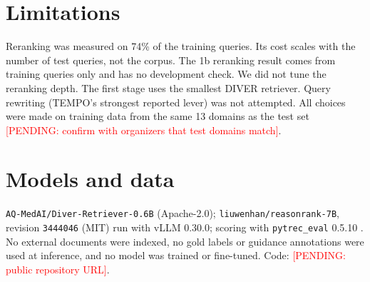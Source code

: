 \documentclass[11pt]{article}
\newcommand{\pending}[1]{\textcolor{red}{[PENDING: #1]}}
\begin{document}
\section{Limitations}
Reranking was measured on 74\% of the training queries. Its cost scales with the number of test
queries, not the corpus. The 1b reranking result comes from training queries only and has no development check. We did not tune the reranking depth. The first stage uses the smallest
DIVER retriever. Query rewriting (TEMPO's strongest reported lever) was not attempted. All
choices were made on training data from the same 13 domains as the test set
\pending{confirm with organizers that test domains match}.

\section*{Models and data}
\texttt{AQ-MedAI/Diver-Retriever-0.6B} (Apache-2.0); \texttt{liuwenhan/reasonrank-7B}, revision
\texttt{3444046} (MIT) run with vLLM 0.30.0; scoring with \texttt{pytrec\_eval} 0.5.10 \citep{vangysel2018pytreceval}.
No external documents were indexed, no gold labels or guidance annotations were used at
inference, and no model was trained or fine-tuned. Code: \pending{public repository URL}.


\end{document}
